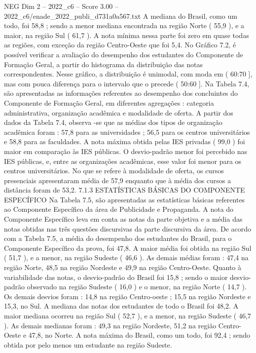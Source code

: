 \begin{textsample}{NEG Dim 2 – 2022\_c6 – Score 3.00 – 2022\_c6/enade\_2022\_publi\_d731a0a567.txt}
A mediana do Brasil, como um todo, foi 58,8 ; sendo a menor mediana encontrada na região Norte ( 55,9 ), e a maior, na região Sul ( 61,7 ).
A nota mínima nessa parte foi zero em quase todas as regiões, com exceção da região Centro-Oeste que foi 5,4.
No Gráfico 7.2, é possível verificar a avaliação do desempenho dos estudantes do Componente de Formação Geral, a partir do histograma da distribuição das notas correspondentes.
Nesse gráfico, a distribuição é unimodal, com moda em ( 60:70 ], mas com pouca diferença para o intervalo que o precede ( 50:60 ].
Na Tabela 7.4, são apresentadas as informações referentes ao desempenho dos concluintes do Componente de Formação Geral, em diferentes agregações : categoria administrativa, organização acadêmica e modalidade de oferta.
A partir dos dados da Tabela 7.4, observa -se que as médias dos tipos de organização acadêmica foram : 57,8 para as universidades ; 56,5 para os centros universitários e 58,8 para as faculdades.
A nota máxima obtida pelas IES privadas ( 99,0 ) foi maior em comparação às IES públicas.
O desvio-padrão menor foi percebido nas IES públicas, e, entre as organizações acadêmicas, esse valor foi menor para os centros universitários.
No que se refere à modalidade de oferta, os cursos presenciais apresentaram média de 57,9 enquanto que à média dos cursos a distância foram de 53,2. 7.1.3 ESTATÍSTICAS BÁSICAS DO COMPONENTE ESPECÍFICO Na Tabela 7.5, são apresentadas as estatísticas básicas referentes ao Componente Específico da área de Publicidade e Propaganda.
A nota do Componente Específico leva em conta as notas da parte objetiva e a média das notas obtidas nas três questões discursivas da parte discursiva da área.
De acordo com a Tabela 7.5, a média do desempenho dos estudantes do Brasil, para o Componente Específico da prova, foi 47,8.
A maior média foi obtida na região Sul ( 51,7 ), e a menor, na região Sudeste ( 46,6 ).
As demais médias foram : 47,4 na região Norte, 48,5 na região Nordeste e 49,9 na região Centro-Oeste.
Quanto à variabilidade das notas, o desvio-padrão do Brasil foi 15,8 ; sendo o maior desvio-padrão observado na região Sudeste ( 16,0 ) e o menor, na região Norte ( 14,7 ).
Os demais desvios foram : 14,8 na região Centro-oeste ; 15,5 na região Nordeste e 15,3, no Sul.
A mediana das notas dos estudantes de todo o Brasil foi 48,2.
A maior mediana ocorreu na região Sul ( 52,7 ), e a menor, na região Sudeste ( 46,7 ).
As demais medianas foram : 49,3 na região Nordeste, 51,2 na região Centro-Oeste e 47,8, no Norte.
A nota máxima do Brasil, como um todo, foi 92,4 ; sendo obtida por pelo menos um estudante na região Sudeste.

\end{textsample}
